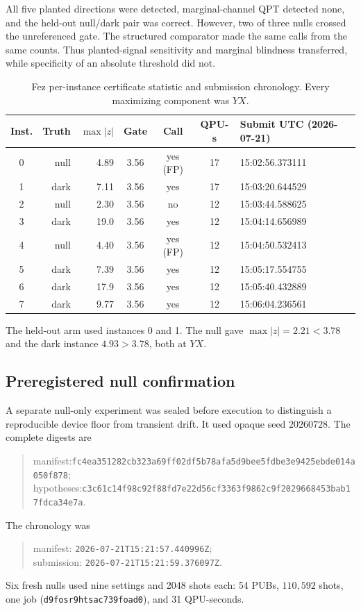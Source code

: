 \documentclass[aps,prl,reprint,superscriptaddress,nofootinbib]{revtex4-2}
\newcommand{\hashfour}[4]{\texttt{#1}\allowbreak\texttt{#2}\allowbreak\texttt{#3}\allowbreak\texttt{#4}}
\begin{document}
All five planted directions were detected, marginal-channel QPT detected none, and the held-out null/dark pair was correct.  However, two of three nulls crossed the unreferenced gate.  The structured comparator made the same calls from the same counts.  Thus planted-signal sensitivity and marginal blindness transferred, while specificity of an absolute threshold did not.

\begin{table}[t]
\caption{Fez per-instance certificate statistic and submission chronology.  Every maximizing component was $YX$.}
\label{tab:fez-instances}
\scriptsize
\begin{ruledtabular}
\begin{tabular}{crrcccl}
Inst. & Truth & $\max|z|$ & Gate & Call & QPU-s & Submit UTC (2026-07-21)\\
\hline
0 & null & 4.89 & 3.56 & yes (FP) & 17 & 15:02:56.373111\\
1 & dark & 7.11 & 3.56 & yes & 17 & 15:03:20.644529\\
2 & null & 2.30 & 3.56 & no & 12 & 15:03:44.588625\\
3 & dark & 19.0 & 3.56 & yes & 12 & 15:04:14.656989\\
4 & null & 4.40 & 3.56 & yes (FP) & 12 & 15:04:50.532413\\
5 & dark & 7.39 & 3.56 & yes & 12 & 15:05:17.554755\\
6 & dark & 17.9 & 3.56 & yes & 12 & 15:05:40.432889\\
7 & dark & 9.77 & 3.56 & yes & 12 & 15:06:04.236561\\
\end{tabular}
\end{ruledtabular}
\end{table}

The held-out arm used instances 0 and 1.  The null gave $\max|z|=2.21<3.78$ and the dark instance $4.93>3.78$, both at $YX$.

\subsection{Preregistered null confirmation}

A separate null-only experiment was sealed before execution to distinguish a reproducible device floor from transient drift.  It used opaque seed $20260728$.  The complete digests are
\begin{quote}\small\raggedright
manifest:\quad \hashfour{fc4ea351282cb323}{a69ff02df5b78afa}{5d9bee5fdbe3e942}{5ebde014a050f878};\\
hypotheses:\quad \hashfour{c3c61c14f98c92f}{88fd7e22d56cf336}{3f9862c9f2029668}{453bab17fdca34e7a}.
\end{quote}
The chronology was
\begin{quote}\small\raggedright
manifest: \texttt{2026-07-21}\allowbreak\texttt{T15:21:57.440996Z};\\
submission: \texttt{2026-07-21}\allowbreak\texttt{T15:21:59.376097Z}.
\end{quote}
Six fresh nulls used nine settings and 2048 shots each: 54 PUBs, $110{,}592$ shots, one job (\texttt{d9fosr9htsac739foad0}), and 31 QPU-seconds.
\end{document}
